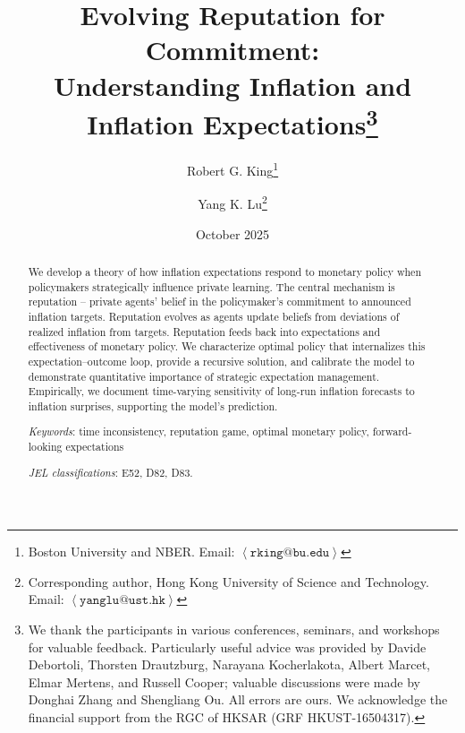 \documentclass[12pt,letter,leqno]{article}
\theoremstyle{asn}
\theoremstyle{lem}
\theoremstyle{slem}
\theoremstyle{prop}
\theoremstyle{appprop}
\theoremstyle{rem}
\theoremstyle{defn}
\begin{document}
\title{\textbf{Evolving Reputation for Commitment:\\ Understanding Inflation and Inflation Expectations}\thanks{
We thank the participants in various conferences, seminars, and workshops for valuable feedback. Particularly useful advice was provided by Davide Debortoli, Thorsten Drautzburg, Narayana Kocherlakota, Albert Marcet, Elmar Mertens, and Russell Cooper; valuable discussions were made by Donghai Zhang and Shengliang Ou. All errors are ours. We acknowledge the
financial support from the RGC of HKSAR (GRF HKUST-16504317).}}
\author{Robert G. King\thanks{%
Boston University and NBER. Email: \href{mailto:rking@bu.edu}{$\left \langle%
\mathtt{rking@bu.edu}\right \rangle $}} \and Yang K. Lu\thanks{%
Corresponding author, Hong Kong University of Science and Technology. Email: 
\href{mailto:yanglu@ust.hk}{$\left \langle \mathtt{yanglu@ust.hk}%
\right
\rangle $}} }
\date{October 2025}
\maketitle

\begin{abstract}
\baselineskip15pt
  
\noindent We develop a theory of how inflation expectations respond to monetary policy when policymakers strategically influence private learning. The central mechanism is reputation -- private agents’ belief in the policymaker’s commitment to announced inflation targets. Reputation evolves as agents update beliefs from deviations of realized inflation from targets. Reputation feeds back into expectations and effectiveness of monetary policy. We characterize optimal policy that internalizes this expectation–outcome loop, provide a recursive solution, and calibrate the model to demonstrate quantitative importance of strategic expectation management. Empirically, we document time-varying sensitivity of long-run inflation forecasts to inflation surprises, supporting the model’s prediction.
\vspace{0.5em}

\vspace{0.5em} \noindent \textit{Keywords}: time inconsistency, reputation
game, optimal monetary policy, forward-looking expectations

\vspace{0.5em} \noindent \textit{JEL classifications}: E52, D82, D83.
\end{abstract}
\end{document}
